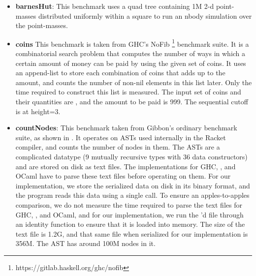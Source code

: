 \begin{itemize}
\item \textbf{barnesHut}:
  This benchmark uses a quad tree
  containing 1M 2-d point-masses distributed uniformly within a square
  to run an nbody simulation over the point-masses.

\item \textbf{coins}
  This benchmark is taken from GHC's NoFib \footnote{https://gitlab.haskell.org/ghc/nofib}
  benchmark suite. It is a combinatorial search problem that computes
  the number of ways in which a certain amount of money can be paid by
  using the given set of coins. It uses an append-list to store each combination
  of coins that adds up to the amount, and counts the number of non-nil elements
  in this list later. Only the time required to construct this list is measured.
  The input set of coins and their quantities are
  \il{[(250,55),(100,88),(25,88),(10,99),(5,122),(1,177)]},
  and the amount to be paid is 999.
  The sequential cutoff is at height=3.

\item \textbf{countNodes}:
  This benchmark taken from Gibbon's ordinary benchmark suite, as shown in .
  It operates on ASTs used internally in the Racket compiler, and counts the number
  of nodes in them.
  The ASTs are a complicated datatype (9 mutually recursive types with 36
  data constructors) and are stored on disk as text files.
  The implementations for GHC, \MPL, and OCaml have to parse these text files before
  operating on them.
  For our implementation, we store the serialized data on disk in its
  binary format, and the program reads this data using a single  call.
  To ensure an apples-to-apples comparison, we do not measure the time required
  to parse the text files for GHC, \MPL{}, and OCaml, and for our implementation,
  we run the 'd file through an identity function to ensure that it
  is loaded into memory.
  The size of the text file is 1.2G, and that same file
  when serialized for our implementation is 356M.
  The AST has around 100M nodes in it.


\end{itemize}
